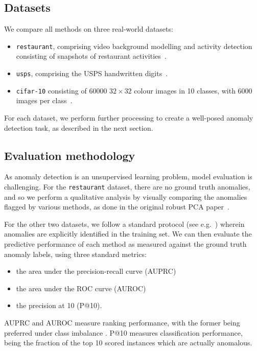 \subsection{Datasets}
We compare all methods on three real-world datasets:
\begin{itemize}
	\item {\tt restaurant}, comprising video background modelling and activity detection consisting of snapshots of restaurant activities~\cite{xiong2011direct}.
	\item {\tt usps}, comprising the USPS handwritten digits~\cite{hull1994database}.
	\item {\tt cifar-10} consisting of 60000 $32\times32$ colour images in 10 classes, with 6000 images per class~\cite{krizhevsky2009learning}.
\end{itemize}
For each dataset, we perform further processing to create a well-posed anomaly detection task, as described in the next section.

\subsection{Evaluation methodology}

As anomaly detection is an unsupervised learning problem, model evaluation is challenging.
For the {\tt restaurant} dataset, there are no ground truth anomalies, and so we perform a qualitative analysis by visually comparing the anomalies flagged by various methods, as done in the original robust PCA paper~\cite{candes2010robust}.

For the other two datasets,
we follow a standard protocol (see e.g.~\cite{xiong2011direct}) wherein anomalies are explicitly identified in the training set.
We can then evaluate the predictive performance of each method as measured against the ground truth anomaly labels,
using three standard metrics:
\begin{itemize}
	\item the area under the precision-recall curve (AUPRC)

	\item the area under the ROC curve (AUROC)

	\item the precision at 10 (P@10).
\end{itemize}
AUPRC and AUROC measure ranking performance, with the former being preferred under class imbalance \cite{Davis:2006}.
P@10 measures classification performance, being the fraction of the top 10 scored instances which are actually anomalous.

